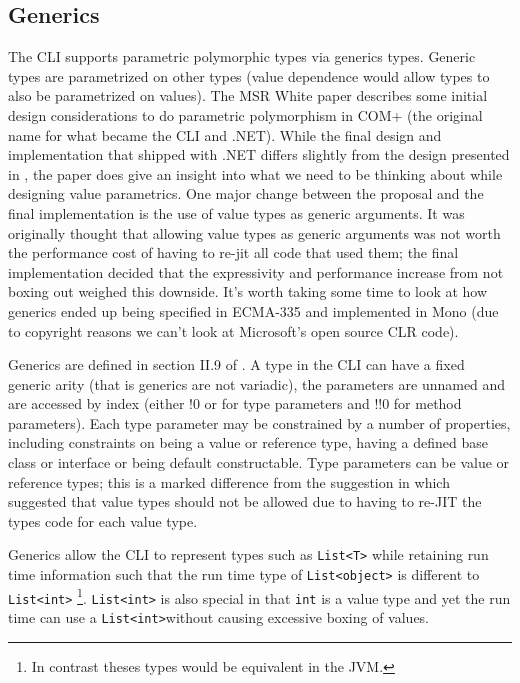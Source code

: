 \documentclass[english]{report}
\begin{document}
\subsection{Generics}

The CLI supports parametric polymorphic types via generics types.
Generic types are parametrized on other types (value dependence would
allow types to also be parametrized on values). The MSR White paper
\cite{ext-vox} describes some initial design considerations to do
parametric polymorphism in COM+ (the original name for what became
the CLI and .NET). While the final design and implementation that
shipped with .NET differs slightly from the design presented in \cite{ext-vox},
the paper does give an insight into what we need to be thinking about
while designing value parametrics. One major change between the proposal
and the final implementation is the use of value types as generic arguments.
It was originally thought that allowing value types as generic arguments
was not worth the performance cost of having to re-jit all code that
used them; the final implementation decided that the expressivity and
performance increase from not boxing out weighed this downside. It's
worth taking some time to look at how generics ended up being specified
in ECMA-335\cite{ecma-335} and implemented in Mono (due to copyright
reasons we can't look at Microsoft\textquoteright{}s open source CLR
code). 

Generics are defined in section II.9 of \cite{ecma-335}. A type in
the CLI can have a fixed generic arity (that is generics are not variadic),
the parameters are unnamed and are accessed by index (either !0 or
for type parameters and !!0 for method parameters). Each type parameter
may be constrained by a number of properties, including constraints
on being a value or reference type, having a defined base class or
interface or being default constructable. Type parameters can be value
or reference types; this is a marked difference from the suggestion
in \cite{ext-vox} which suggested that value types should not be
allowed due to having to re-JIT the types code for each value type.

Generics allow the CLI to represent types such as \texttt{List<T>}
while retaining run time information such that the run time type of
\texttt{List<object>} is different to \texttt{List<int>}%
\footnote{In contrast theses types would be equivalent in the JVM.%
}. \texttt{List<int>} is also special in that \texttt{int} is a value
type and yet the run time can use a \texttt{List<int>}without causing
excessive boxing of values.
\end{document}
